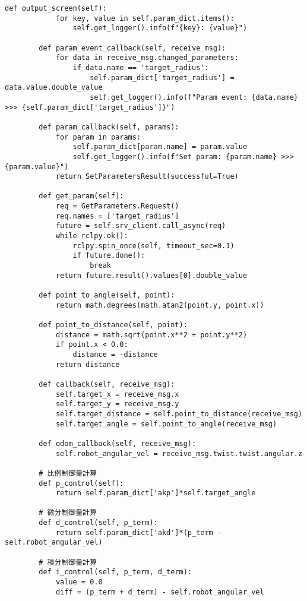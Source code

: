 \begin{lstlisting}[caption=base\_controller.py, label=base]
        def output_screen(self):
            for key, value in self.param_dict.items():
                self.get_logger().info(f"{key}: {value}")
    
        def param_event_callback(self, receive_msg):
            for data in receive_msg.changed_parameters:
                if data.name == 'target_radius':
                    self.param_dict['target_radius'] = data.value.double_value
                    self.get_logger().info(f"Param event: {data.name} >>> {self.param_dict['target_radius']}")
    
        def param_callback(self, params):
            for param in params:
                self.param_dict[param.name] = param.value
                self.get_logger().info(f"Set param: {param.name} >>> {param.value}")
            return SetParametersResult(successful=True)
    
        def get_param(self):
            req = GetParameters.Request()
            req.names = ['target_radius']
            future = self.srv_client.call_async(req)
            while rclpy.ok():
                rclpy.spin_once(self, timeout_sec=0.1)
                if future.done():
                    break
            return future.result().values[0].double_value
    
        def point_to_angle(self, point):
            return math.degrees(math.atan2(point.y, point.x))
    
        def point_to_distance(self, point):
            distance = math.sqrt(point.x**2 + point.y**2)
            if point.x < 0.0:
                distance = -distance
            return distance
    
        def callback(self, receive_msg):
            self.target_x = receive_msg.x
            self.target_y = receive_msg.y
            self.target_distance = self.point_to_distance(receive_msg)
            self.target_angle = self.point_to_angle(receive_msg)
    
        def odom_callback(self, receive_msg):
            self.robot_angular_vel = receive_msg.twist.twist.angular.z
    
        # 比例制御量計算
        def p_control(self):
            return self.param_dict['akp']*self.target_angle
    
        # 微分制御量計算
        def d_control(self, p_term):
            return self.param_dict['akd']*(p_term - self.robot_angular_vel)
    
        # 積分制御量計算
        def i_control(self, p_term, d_term):
            value = 0.0
            diff = (p_term + d_term) - self.robot_angular_vel
    

\end{lstlisting}
